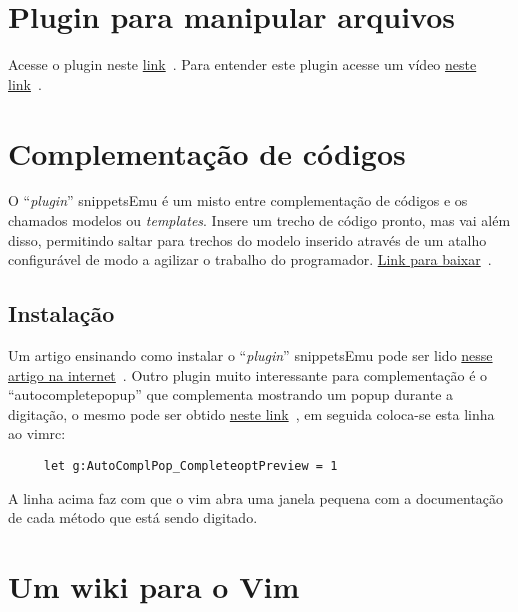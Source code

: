 \section{Plugin para manipular arquivos}

Acesse o plugin neste
\href{http://www.vim.org/scripts/script.php?script\_id=2337#0.1.9}{link}~\cite{PluginParaArquivos01}.
Para entender este plugin acesse um vídeo
\href{http://www.screencast.com/t/P6nJkJ0DE}{neste
link}~\cite{PluginParaArquivos02}.


\section{Complementação de códigos}
\label{Complementação de códigos}

O ``{\em plugin}'' snippetsEmu é um misto entre complementação de códigos e
os chamados modelos ou {\em templates}. Insere um trecho de código pronto,
mas vai além disso, permitindo saltar para trechos do modelo inserido
através de um atalho configurável de modo a agilizar o trabalho do
programador. \href{http://www.vim.org/scripts/script.php?script\_id=1318}{Link para baixar}~\cite{PluginSnippetsEmu}.

\subsection{Instalação}
\label{Instalação}

Um artigo ensinando como instalar o ``{\em plugin}'' snippetsEmu pode ser lido 
\href{http://vivaotux.blogspot.com/2008/03/instalando-o-plugin-snippetsemu-no-vim.html}{nesse artigo na internet}~\cite{SilvasnipptsEmu}.
Outro plugin muito interessante para complementação é o ``autocompletepopup'' que complementa 
mostrando um popup durante a digitação, o mesmo pode ser obtido 
\href{http://www.vim.org/scripts/script.php?script\_id=1879}{neste link}~\cite{NishidaAutoCompletePopup}, em seguida coloca-se esta 
linha ao vimrc:

\begin{verbatim}
     let g:AutoComplPop_CompleteoptPreview = 1
\end{verbatim}

A linha acima faz com que o vim abra uma janela pequena com a documentação
de cada método que está sendo digitado.

\section{Um wiki para o Vim}\label{sec:Um wiki para o Vim}

